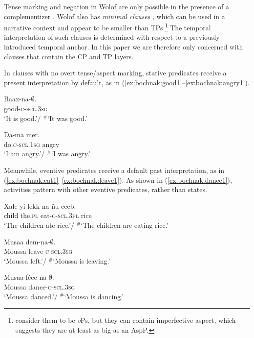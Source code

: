 \documentclass[output=paper,newtxmath,modfonts,nonflat,draftmode]{langsci/langscibook}
\begin{document}
 Tense marking and negation in Wolof are only
possible in the presence of a complementizer \citep{Njie1982}. Wolof
also has \textit{minimal clauses} \citep{Sauvageot1965,
  church81systeme,  Dialo1981, robert91approche,
  Zribi-HertzDiagne2003}, which can be used in a narrative context and
appear to be smaller than TPs.\footnote{\cite{Zribi-HertzDiagne2003} consider
them to be \textit{v}Ps, but they can contain imperfective aspect,
which suggests they are at least as big as an AspP.} The temporal interpretation of such
clauses is determined with respect to a previously introduced
temporal anchor. In this paper we
are therefore only concerned with clauses that contain the CP and TP layers.

In clauses with no overt tense/aspect marking, stative predicates receive a present interpretation by default, as in (\ref{ex:bochnak:good1}--\ref{ex:bochnak:angry1}).

\ea
\gll Baax-na-$\emptyset$.\\
good-\textsc{c}-\textsc{scl.3sg}\\
\glt `It is good.'/ $^{\#}$`It was good.'\label{ex:bochnak:good1}
\z

\ea
\gll Da-ma mer.\\
do.\textsc{c-scl.1sg} angry\\
\glt `I am angry.'/ $^{\#}$`I was angry.'\label{ex:bochnak:angry1}
\z

Meanwhile, eventive predicates receive a default past interpretation, as in (\ref{ex:bochnak:eat1}--\ref{ex:bochnak:leave1}). As shown in (\ref{ex:bochnak:dance1}), activities pattern with other eventive predicates, rather than states.

\ea
\gll Xale yi lekk-na-\~nu ceeb.\\
child the.\textsc{pl} eat-\textsc{c}-\textsc{scl.3pl} rice\\
\glt `The children ate rice.'/ $^{\#}$`The children are eating
  rice.'\label{ex:bochnak:eat1}
\z
 
\ea
\gll Musaa dem-na-$\emptyset$.\\
Moussa leave-\textsc{c}-\textsc{scl.3sg}\\
\glt `Moussa left.'/ $^{\#}$`Moussa is leaving.'\label{ex:bochnak:leave1}
\z

\ea
\gll Musaa f\'ecc-na-$\emptyset$.\\
Moussa dance-\textsc{c}-\textsc{scl.3sg}\\
\glt `Moussa danced.'/ $^{\#}$`Moussa is dancing.'\label{ex:bochnak:dance1}
\z
\end{document}
